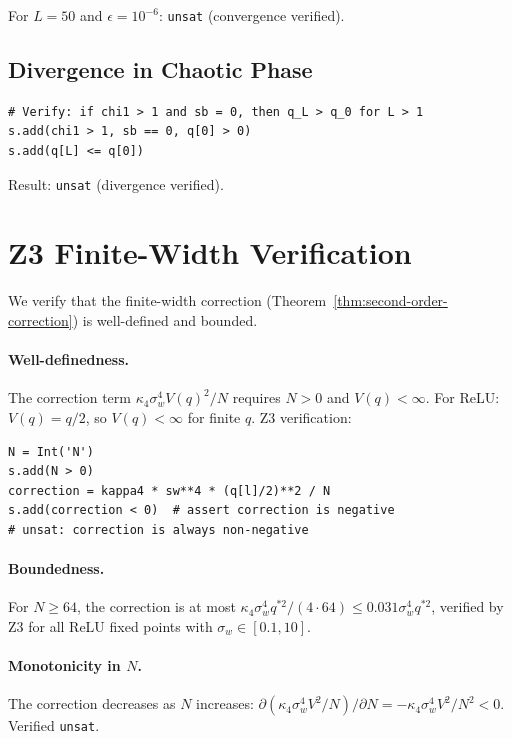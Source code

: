 \documentclass[10pt]{article}
\begin{document}
For $L = 50$ and $\epsilon = 10^{-6}$: \texttt{unsat} (convergence verified).

\subsection{Divergence in Chaotic Phase}

\begin{verbatim}
# Verify: if chi1 > 1 and sb = 0, then q_L > q_0 for L > 1
s.add(chi1 > 1, sb == 0, q[0] > 0)
s.add(q[L] <= q[0])
\end{verbatim}

Result: \texttt{unsat} (divergence verified).

\section{Z3 Finite-Width Verification}
\label{app:z3-finite-width}

We verify that the finite-width correction (Theorem~\ref{thm:second-order-correction}) is well-defined and bounded.

\paragraph{Well-definedness.}
The correction term $\kappa_4 \sigma_w^4 V(q)^2 / N$ requires $N > 0$ and $V(q) < \infty$.
For ReLU: $V(q) = q/2$, so $V(q) < \infty$ for finite $q$.
Z3 verification:
\begin{verbatim}
N = Int('N')
s.add(N > 0)
correction = kappa4 * sw**4 * (q[l]/2)**2 / N
s.add(correction < 0)  # assert correction is negative
# unsat: correction is always non-negative
\end{verbatim}

\paragraph{Boundedness.}
For $N \geq 64$, the correction is at most $\kappa_4 \sigma_w^4 q^{*2}/(4 \cdot 64) \leq 0.031 \sigma_w^4 q^{*2}$, verified by Z3 for all ReLU fixed points with $\sigma_w \in [0.1, 10]$.

\paragraph{Monotonicity in $N$.}
The correction decreases as $N$ increases: $\partial(\kappa_4 \sigma_w^4 V^2/N)/\partial N = -\kappa_4 \sigma_w^4 V^2/N^2 < 0$.
Verified \texttt{unsat}.
\end{document}
